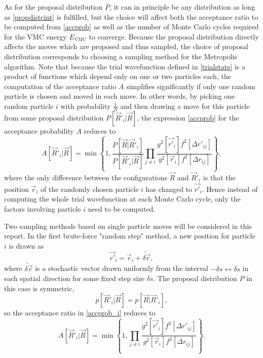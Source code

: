 \documentclass[a4paper,8pt]{article}
\begin{document}
\begin{multicols}{2}
As for the proposal distribution $P$, it can in principle be any distribution as long as \eqref{propdistcint} is fulfilled, but the choice will affect both the acceptance ratio to be computed from \eqref{accprob} as well as the number of Monte Carlo cycles required for the VMC energy $E_\text{VMC}$ to converge. Because the proposal distribution directly affects the moves which are proposed and thus sampled, the choice of proposal distribution corresponds to choosing a sampling method for the Metropolis algorithm. Note that because the trial wavefunction defined in \eqref{trialstate} is a product of functions which depend only on one or two particles each, the computation of the acceptance ratio $A$ simplifies significantly if only one random particle is chosen and moved in each move. In other words, by picking one random particle $i$ with probability $\frac{1}{N}$ and then drawing a move for this particle from some proposal distribution $P[\vec{R}'_i|\vec{R}]$, the expression \eqref{accprob} for the acceptance probability $A$ reduces to
\begin{equation}\label{accprob_i}
A[\vec{R}'_i|\vec{R}] = \min\left\{1,\frac{P[\vec{R}|\vec{R}'_i]}{P[\vec{R}'_i|\vec{R}]}\prod\limits_{j \neq i} \frac{g^2[\vec{r'}_i]f^2[\Delta r'_{ij}]}{g^2[\vec{r}_i]f^2[\Delta r_{ij}]}\right\},
\end{equation}
where the only difference between the configurations $\vec{R}$ and $\vec{R}'_i$ is that the position $\vec{r}_i$ of the randomly chosen particle $i$ has changed to $\vec{r'}_i$.  Hence instead of computing the whole trial wavefunction at each Monte Carlo cycle, only the factors involving particle $i$ need to be computed.

Two sampling methods based on single particle moves will be considered in this report. In the first brute-force "random step" method, a new position for particle $i$ is drawn as
\begin{equation}\label{propRS}
\vec{r'}_i = \vec{r}_i+\widetilde{\delta\vec{r}},
\end{equation}
where $\widetilde{\delta\vec{r}}$ is a stochastic vector drawn uniformly from the interval $-\delta s \leftrightarrow \delta s$ in each spatial direction for some fixed step size $\delta s$. The proposal distribution $P$ in this case is symmetric,
\begin{equation}
p[\vec{R}'_i|\vec{R}] = p[\vec{R}|\vec{R}'_i], \nonumber
\end{equation}
so the acceptance ratio in \eqref{accprob_i} reduces to
\begin{equation}\label{accprobRS}
A[\vec{R}'_i|\vec{R}] = \min\left\{1,\prod\limits_{j \neq i} \frac{g^2[\vec{r'}_i]f^2[\Delta r'_{ij}]}{g^2[\vec{r}_i]f^2[\Delta r_{ij}]}\right\}.
\end{equation}


\end{multicols}
\end{document}
